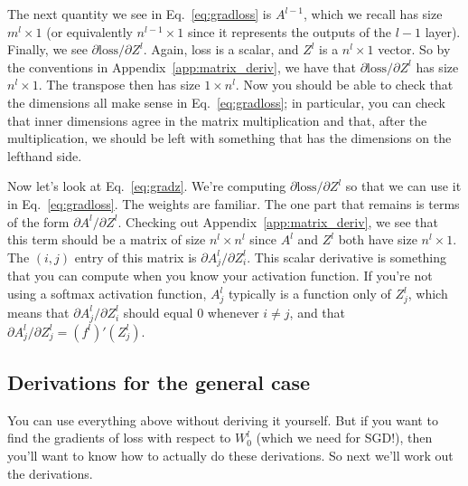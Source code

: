 The next quantity we see in Eq.~\ref{eq:gradloss} is $A^{l-1}$, which we recall has size $m^l \times 1$ (or equivalently $n^{l-1} \times 1$ since it represents the outputs of the $l-1$ layer). Finally, we see $\partial \text{loss} / \partial Z^l$. Again, loss is a scalar, and $Z^l$ is a $n^l \times 1$ vector. So by the conventions in Appendix~\ref{app:matrix_deriv}, we have that $\partial \text{loss} / \partial Z^l$ has size $n^l \times 1$. The transpose then has size $1 \times n^l$. Now you should be able to check that the dimensions all make sense in Eq.~\ref{eq:gradloss}; in particular, you can check that inner dimensions agree in the matrix multiplication and that, after the multiplication, we should be left with something that has the dimensions on the lefthand side.

Now let's look at Eq.~\ref{eq:gradz}. We're computing $\partial \text{loss} / \partial Z^l$ so that we can use it in Eq.~\ref{eq:gradloss}. The weights are familiar. The one part that remains is terms of the form $\partial A^l / \partial Z^l$. Checking out Appendix~\ref{app:matrix_deriv}, we see that this term should be a matrix of size $n^l \times n^l$ since $A^l$ and $Z^l$ both have size $n^l \times 1$. The $(i,j)$ entry of this matrix is $\partial A^l_j / \partial Z^l_i$. This scalar derivative is something that you can compute when you know your activation function. If you're not using a softmax activation function, $A^l_j$ typically is a function only of $Z^l_j$, which means that $\partial A^l_j / \partial Z^l_i$ should equal 0 whenever $i \ne j$, and that $\partial A^l_j / \partial Z^l_j = (f^l)'(Z^l_j)$.



\subsection{Derivations for the general case}

You can use everything above without deriving it yourself. But if you want to find the gradients of loss with respect to $W^l_0$ (which we need for SGD!), then you'll want to know how to actually do these derivations. So next we'll work out the derivations.

